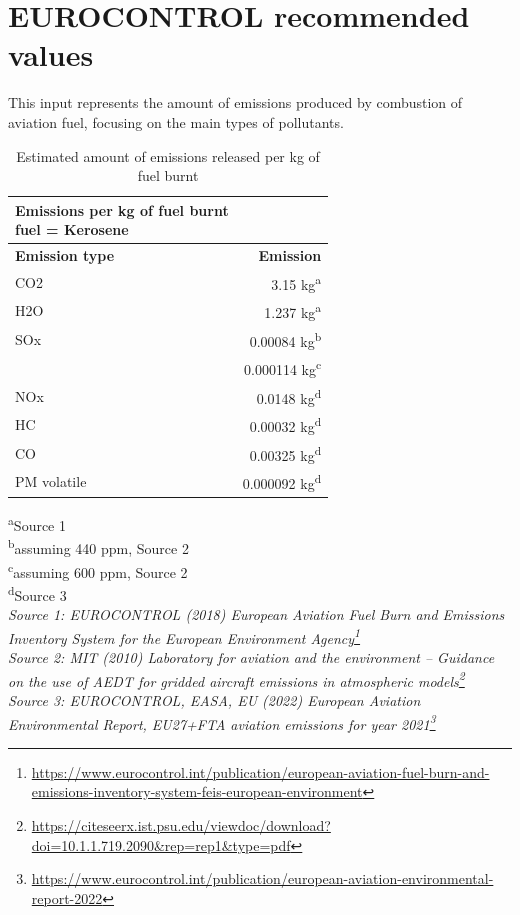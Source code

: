 \documentclass[
  11pt,
  a4paper,
]{book}
\DeclareRobustCommand{\href}[2]{#2\footnote{\url{#1}}}
\begin{document}
\hypertarget{eurocontrol-recommended-values-4}{%
\section{EUROCONTROL recommended
values}\label{eurocontrol-recommended-values-4}}

This input represents the amount of emissions produced by combustion of
aviation fuel, focusing on the main types of pollutants.

\hypertarget{tbl-emissions-per-kg-fuel}{}
\setlength{\LTpost}{0mm}
\begin{longtable}{lr}
\caption{\label{tbl-emissions-per-kg-fuel}Estimated amount of emissions released per kg of fuel burnt }\tabularnewline

\caption*{
{\large Emissions per kg of fuel burnt} \\ 
{\small fuel = Kerosene}
} \\ 
\toprule
\textbf{Emission type} & \textbf{Emission} \\ 
\midrule
CO2 & 3.15 kg\textsuperscript{a} \\ 
H2O & 1.237 kg\textsuperscript{a} \\ 
SOx & 0.00084 kg\textsuperscript{b} \\ 
 & 0.000114 kg\textsuperscript{c} \\ 
NOx & 0.0148 kg\textsuperscript{d} \\ 
HC & 0.00032 kg\textsuperscript{d} \\ 
CO & 0.00325 kg\textsuperscript{d} \\ 
PM volatile & 0.000092 kg\textsuperscript{d} \\ 
\bottomrule
\end{longtable}
\begin{minipage}{\linewidth}
\textsuperscript{a}Source 1\\
\textsuperscript{b}assuming 440 ppm, Source 2\\
\textsuperscript{c}assuming 600 ppm, Source 2\\
\textsuperscript{d}Source 3\\
\emph{Source 1: \href{https://www.eurocontrol.int/publication/european-aviation-fuel-burn-and-emissions-inventory-system-feis-european-environment}{EUROCONTROL (2018) European Aviation Fuel Burn and Emissions Inventory System for the European Environment Agency}}\\
\emph{Source 2: \href{https://citeseerx.ist.psu.edu/viewdoc/download?doi=10.1.1.719.2090\&rep=rep1\&type=pdf}{MIT (2010) Laboratory for aviation and the environment -- Guidance on the use of AEDT for gridded aircraft emissions in atmospheric models}}\\
\emph{Source 3: \href{https://www.eurocontrol.int/publication/european-aviation-environmental-report-2022}{EUROCONTROL, EASA, EU (2022) European Aviation Environmental Report, EU27+FTA aviation emissions for year 2021}}\\
\end{minipage}
\end{document}
